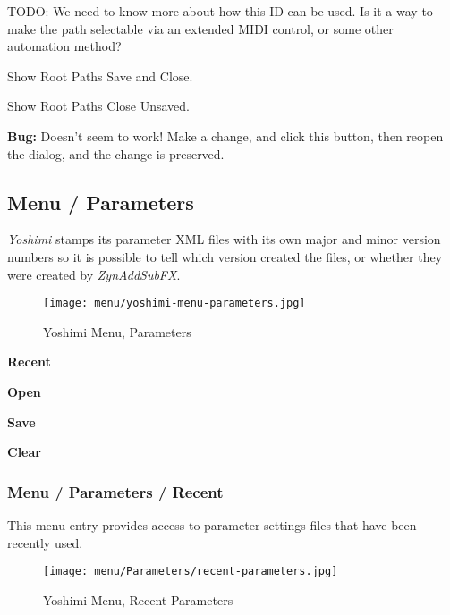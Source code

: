    TODO: We need to know more about how this ID can be used.
   Is it a way to make the path selectable via an extended MIDI control, or
   some other automation method?

   Show Root Paths Save and Close.

   Show Root Paths Close Unsaved.

   \textbf{Bug:}
   Doesn't seem to work!
   Make a change, and click this button, then reopen the dialog, 
   and the change is preserved.

\subsection{Menu / Parameters}
\label{subsec:menu_parameters}

   \textsl{Yoshimi} stamps its parameter XML files with its own major and
   minor version numbers so it is possible to tell which version created the
   files, or whether they were created by \textsl{ZynAddSubFX}.

\begin{figure}[H]
   \centering 
   \texttt{[image: menu/yoshimi-menu-parameters.jpg]}
   \caption{Yoshimi Menu, Parameters}
   \label{fig:yoshimi_menu_parameters}
\end{figure}

   \begin{enumber}
      \item \textbf{Recent}
      \item \textbf{Open}
      \item \textbf{Save}
      \item \textbf{Clear}
   \end{enumber}

\subsubsection{Menu / Parameters / Recent}
\label{subsubsec:menu_parameters_recent}

   This menu entry provides access to parameter settings files that have
   been recently used.

\begin{figure}[H]
   \centering 
   \texttt{[image: menu/Parameters/recent-parameters.jpg]}
   \caption{Yoshimi Menu, Recent Parameters}
   \label{fig:yoshimi_menu_recent_parameters}
\end{figure}


